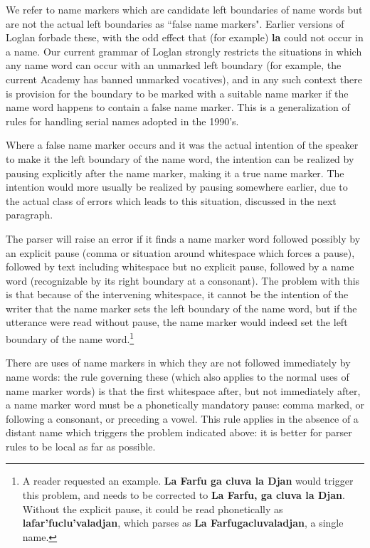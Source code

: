 \documentclass[12pt]{book}
\begin{document}
We refer to name markers which are candidate left boundaries of name words but are not the actual left boundaries as ``false name markers".  Earlier versions of Loglan forbade these, with the odd effect that (for example) {\bf la} could not occur in a name.  Our current grammar of Loglan strongly restricts the situations in which any name word can occur with an unmarked left boundary (for example, the current Academy has banned unmarked vocatives), and in any such context there is provision for the boundary to be marked with a suitable name marker if the name word happens to contain a false name marker.  This is a generalization of rules for handling serial names adopted in the 1990's.

Where a false name marker occurs and it was the actual intention of the speaker to make it the left boundary of the name word, the intention can be realized by pausing explicitly after the name marker, making it a true name marker.  The intention would more usually be realized by pausing somewhere earlier, due to the actual class of errors which leads to this situation, discussed in the next paragraph.

The parser will raise an error if it finds a name marker word followed possibly by an explicit pause (comma or situation around whitespace which forces a pause), followed by text including whitespace but no explicit pause, followed by a name word (recognizable by its right boundary at a consonant). The problem with this is that because of the intervening whitespace, it cannot be  the intention of the writer that the name marker sets the left boundary of the name word, but if the utterance were read without pause, the name marker would indeed set the left boundary of the name word.\footnote{A reader requested an example.  {\bf La Farfu ga cluva la Djan} would trigger this problem, and needs to be corrected to {\bf La Farfu, ga cluva la Djan}.  Without the explicit pause, it could be read phonetically as {\bf lafar'fuclu'valadjan}, which parses as {\bf La Farfugacluvaladjan}, a single name.}  

There are uses of name markers in which they are not followed immediately by name words:  the rule governing these (which also applies to the normal uses of name marker words) is that the first whitespace after, but not immediately after, a name marker word must be a phonetically mandatory pause: comma marked, or following a consonant, or preceding a vowel.  This rule applies in the absence of a distant name which triggers the problem indicated above:  it is better for parser rules to be local as far as possible.
\end{document}
